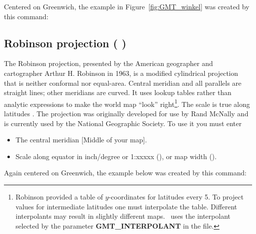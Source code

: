 Centered on Greenwich, the example in Figure~\ref{fig:GMT_winkel}
was created by this command:



\subsection{Robinson projection ( )}


The Robinson projection, presented by the American geographer and cartographer Arthur H. Robinson in
1963, is a modified cylindrical projection that is neither
conformal nor equal-area.  Central meridian and all parallels
are straight lines; other meridians are curved.  It uses
lookup tables rather than analytic expressions to make the
world map ``look'' right\footnote{Robinson provided a table of
$y$-coordinates for latitudes every 5\DS .  To project values
for intermediate latitudes one must interpolate the table.
Different interpolants may result in slightly different maps.
\gmt\ uses the interpolant selected by the parameter \textbf{GMT\_INTERPOLANT}
in the  file.}.  The scale is true
along latitudes \DS.  The projection was originally
developed for use by Rand McNally and is currently used by
the National Geographic Society.  To use it you must enter 

\begin{itemize} 
\item The central meridian [Middle of your map].
\item Scale along equator in inch/degree or 1:xxxxx (), or map width ().
\end{itemize} 

Again centered on Greenwich, the example below was created by this command: 



